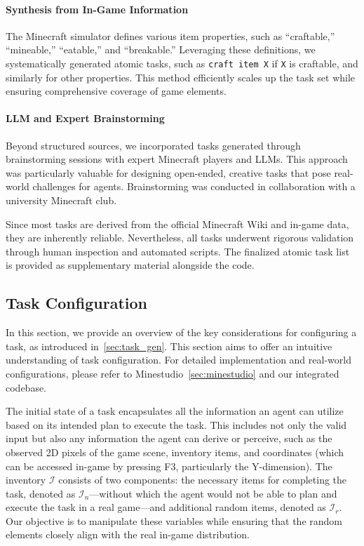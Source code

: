 \paragraph{Synthesis from In-Game Information} 
The Minecraft simulator defines various item properties, such as ``craftable,'' ``mineable,'' ``eatable,'' and ``breakable.'' Leveraging these definitions, we systematically generated atomic tasks, such as \texttt{craft item X} if \texttt{X} is craftable, and similarly for other properties. This method efficiently scales up the task set while ensuring comprehensive coverage of game elements.

\paragraph{LLM and Expert Brainstorming} 
Beyond structured sources, we incorporated tasks generated through brainstorming sessions with expert Minecraft players and LLMs. This approach was particularly valuable for designing open-ended, creative tasks that pose real-world challenges for agents. Brainstorming was conducted in collaboration with a university Minecraft club.

Since most tasks are derived from the official Minecraft Wiki and in-game data, they are inherently reliable. Nevertheless, all tasks underwent rigorous validation through human inspection and automated scripts. The finalized atomic task list is provided as supplementary material alongside the code.


\label{sec:task-acquisition}

\subsection{Task Configuration}

In this section, we provide an overview of the key considerations for configuring a task, as introduced in~\cref{sec:task_gen}. This section aims to offer an intuitive understanding of task configuration. For detailed implementation and real-world configurations, please refer to Minestudio~\cref{sec:minestudio} and our integrated codebase.

The initial state of a task encapsulates all the information an agent can utilize based on its intended plan to execute the task. This includes not only the valid input but also any information the agent can derive or perceive, such as the observed 2D pixels of the game scene, inventory items, and coordinates (which can be accessed in-game by pressing F3, particularly the Y-dimension). The inventory $\mathcal{I}$ consists of two components: the necessary items for completing the task, denoted as $\mathcal{I}_n$—without which the agent would not be able to plan and execute the task in a real game—and additional random items, denoted as $\mathcal{I}_r$. Our objective is to manipulate these variables while ensuring that the random elements closely align with the real in-game distribution.

